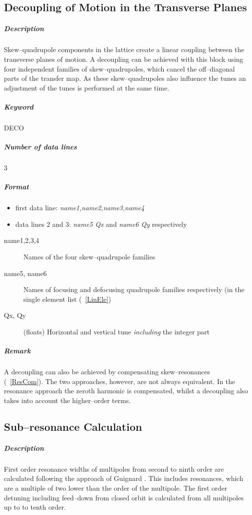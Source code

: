 \documentclass[a4paper,11pt]{report}
\begin{document}
\subsection{Decoupling of Motion in the Transverse Planes}
\label{LinDec} 

\subparagraph{Description} Skew--quadrupole components in the lattice
create a linear coupling between the transverse planes of motion. A
decoupling can be achieved with this block using four independent
families of skew--quadrupoles, which cancel the off--diagonal parts of
the transfer map. As these skew--quadrupoles also influence the tunes
an adjustment of the tunes is performed at the same time.

\subparagraph{Keyword} DECO \subparagraph{Number of data lines} 3

\subparagraph{Format}
\begin{itemize}
\item first data line: {\em name1,name2,name3,name4}
\item data lines 2 and 3: {\em name5 Qx} \/and {\em name6 Qy}
  \/respectively
\end{itemize}

\begin{description}
\item [name1,2,3,4] Names of the four skew--quadrupole families
\item [name5, name6] Names of focusing and defocusing quadrupole
  families respectively (in the single element list (~\ref{LinEle})
\item [Qx, Qy] (floats) Horizontal and vertical tune {\em including}
  \/the integer part
\end{description}

\subparagraph{Remark} A decoupling can also be achieved by
compensating skew--resonances (~\ref{ResCom}).  The two approaches,
however, are not always equivalent. In the resonance approach the
zeroth harmonic is compensated, whilst a decoupling also takes into
account the higher--order terms.

\subsection{Sub--resonance Calculation} \label{SubCal}

\subparagraph{Description} First order resonance widths of multipoles
from second to ninth order are calculated following the approach of
Guignard \cite{Gilbert78}. This includes resonances, which are a
multiple of two lower than the order of the multipole. The first order
detuning including feed--down from closed orbit is calculated from all
multipoles up to to tenth order.
\end{document}
